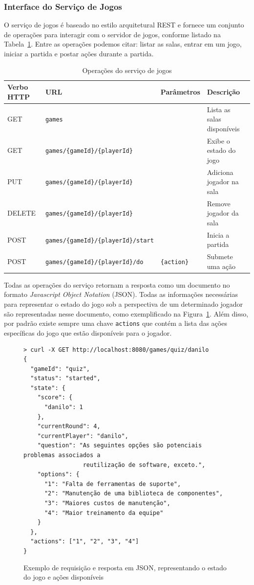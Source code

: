 \documentclass[12pt]{article}
\newcommand{\tra}[1]{\renewcommand{\arraystretch}{#1}}
\begin{document}
\subsubsection{Interface do Serviço de Jogos}

O serviço de jogos é baseado no estilo arquitetural REST e fornece um conjunto de operações para interagir com o servidor de jogos, conforme listado na Tabela~\ref{tab:operations}. Entre as operações podemos citar: listar as salas, entrar em um jogo, iniciar a partida e postar ações durante a partida. 

\begin{table}[htb]\centering
\footnotesize
\tra{1.1}
\begin{tabular}{@{}llll@{}}\toprule
\textbf{Verbo HTTP} & \textbf{URL} & \textbf{Parâmetros} & \textbf{Descrição} \\
\midrule
GET & \texttt{games} & & Lista as salas disponíveis \\
GET & \texttt{games/\{gameId\}/\{playerId\}} & & Exibe o estado do jogo \\
PUT & \texttt{games/\{gameId\}/\{playerId\}} & & Adiciona jogador na sala \\
DELETE & \texttt{games/\{gameId\}/\{playerId\}} & & Remove jogador da sala \\
POST & \texttt{games/\{gameId\}/\{playerId\}/start} & & Inicia a partida \\
POST & \texttt{games/\{gameId\}/\{playerId\}/do} & \texttt{\{action\}} & Submete uma ação \\
\bottomrule
\end{tabular}
\caption{Operações do serviço de jogos}
\label{tab:operations}
\end{table}

Todas as operações do serviço retornam a resposta como um documento no formato \emph{Javascript Object Notation} (JSON). Todas as informações necessárias para representar o estado do jogo sob a perspectiva de um determinado jogador são representadas nesse documento, como exemplificado na Figura~\ref{img:json}. Além disso, por padrão existe sempre uma chave \texttt{actions} que contém a lista das ações específicas do jogo que estão disponíveis para o jogador.

\begin{figure}[htb]
\centering
\footnotesize
\begin{verbatim}
> curl -X GET http://localhost:8080/games/quiz/danilo
{
  "gameId": "quiz",
  "status": "started",
  "state": {
    "score": {
      "danilo": 1
    },
    "currentRound": 4,
    "currentPlayer": "danilo",
    "question": "As seguintes opções são potenciais problemas associados a
                 reutilização de software, exceto.",
    "options": {
      "1": "Falta de ferramentas de suporte",
      "2": "Manutenção de uma biblioteca de componentes",
      "3": "Maiores custos de manutenção",
      "4": "Maior treinamento da equipe"
    }
  },
  "actions": ["1", "2", "3", "4"]
}
\end{verbatim}
\caption{Exemplo de requisição e resposta em JSON, representando o estado do jogo e ações disponíveis}
\label{img:json}
\end{figure}
\end{document}

